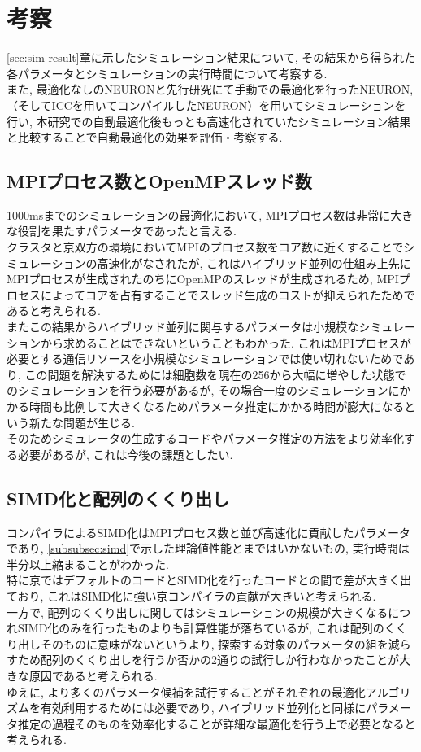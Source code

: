 \section{考察}
\ref{sec:sim-result}章に示したシミュレーション結果について,
その結果から得られた各パラメータとシミュレーションの実行時間について考察する.\\
また, 最適化なしのNEURONと先行研究にて手動での最適化を行ったNEURON, （そしてICCを用いてコンパイルしたNEURON）を用いてシミュレーションを行い,
本研究での自動最適化後もっとも高速化されていたシミュレーション結果と比較することで自動最適化の効果を評価・考察する.\\

\subsection{MPIプロセス数とOpenMPスレッド数}
1000msまでのシミュレーションの最適化において, MPIプロセス数は非常に大きな役割を果たすパラメータであったと言える.\\
クラスタと京双方の環境においてMPIのプロセス数をコア数に近くすることでシミュレーションの高速化がなされたが,
これはハイブリッド並列の仕組み上先にMPIプロセスが生成されたのちにOpenMPのスレッドが生成されるため,
MPIプロセスによってコアを占有することでスレッド生成のコストが抑えられたためであると考えられる.\\
またこの結果からハイブリッド並列に関与するパラメータは小規模なシミュレーションから求めることはできないということもわかった.
これはMPIプロセスが必要とする通信リソースを小規模なシミュレーションでは使い切れないためであり,
この問題を解決するためには細胞数を現在の256から大幅に増やした状態でのシミュレーションを行う必要があるが,
その場合一度のシミュレーションにかかる時間も比例して大きくなるためパラメータ推定にかかる時間が膨大になるという新たな問題が生じる.\\
そのためシミュレータの生成するコードやパラメータ推定の方法をより効率化する必要があるが, これは今後の課題としたい.\\

\subsection{SIMD化と配列のくくり出し}
コンパイラによるSIMD化はMPIプロセス数と並び高速化に貢献したパラメータであり,
\ref{subsubsec:simd}で示した理論値性能とまではいかないもの, 実行時間は半分以上縮まることがわかった.\\
特に京ではデフォルトのコードとSIMD化を行ったコードとの間で差が大きく出ており, これはSIMD化に強い京コンパイラの貢献が大きいと考えられる.\\
一方で, 配列のくくり出しに関してはシミュレーションの規模が大きくなるにつれSIMD化のみを行ったものよりも計算性能が落ちているが,
これは配列のくくり出しそのものに意味がないというより,
探索する対象のパラメータの組を減らすため配列のくくり出しを行うか否かの2通りの試行しか行わなかったことが大きな原因であると考えられる.\\
ゆえに, より多くのパラメータ候補を試行することがそれぞれの最適化アルゴリズムを有効利用するためには必要であり,
ハイブリッド並列化と同様にパラメータ推定の過程そのものを効率化することが詳細な最適化を行う上で必要となると考えられる.\\

